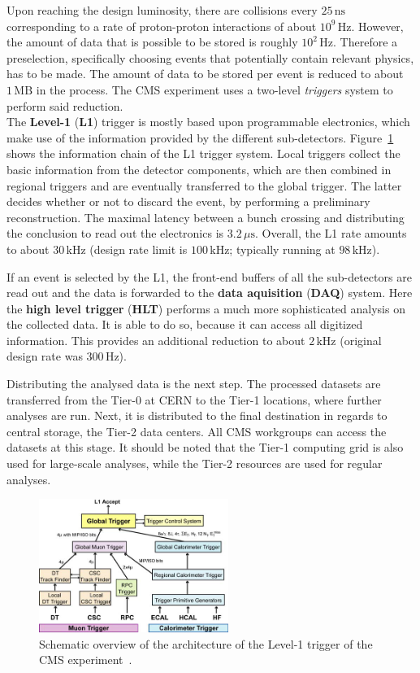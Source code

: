 Upon reaching the design luminosity, there are collisions every $25\,\text{ns}$ corresponding to a rate of proton-proton interactions of about $10^9\,\text{Hz}$. However, the amount of data that is possible to be stored is roughly $10^2\,\text{Hz}$. Therefore a preselection, specifically choosing events that potentially contain relevant physics, has to be made. The amount of data to be stored per event is reduced to about $1\,\text{MB}$ in the process. The CMS experiment uses a two-level \textit{triggers} system to perform said reduction. \\

The \textbf{Level-1} (\textbf{L1}) trigger is mostly based upon programmable electronics, which make use of the information provided by the different sub-detectors. Figure~\ref{fig:lvl1trig} shows the information chain of the L1 trigger system. Local triggers collect the basic information from the detector components, which are then combined in regional triggers and are eventually transferred to the global trigger. The latter decides whether or not to discard the event, by performing a preliminary reconstruction. The maximal latency between a bunch crossing and distributing the conclusion to read out the electronics is $3.2\,\mu\text{s}$. Overall, the L1 rate amounts to about $30\,\text{kHz}$ (design rate limit is $100\,\text{kHz}$; typically running at $98\,\text{kHz}$).

If an event is selected by the L1, the front-end buffers of all the sub-detectors are read out and the data is forwarded to the \textbf{data aquisition} (\textbf{DAQ}) system. Here the \textbf{high level trigger} (\textbf{HLT}) performs a much more sophisticated analysis on the collected data. It is able to do so, because it can access all digitized information. This provides an additional reduction to about $2\,\text{kHz}$ (original design rate was $300\,\text{Hz}$).

Distributing the analysed data is the next step. The processed datasets are transferred from the Tier-0 at CERN to the Tier-1 locations, where further analyses are run. Next, it is distributed to the final destination in regards to central storage, the Tier-2 data centers. All CMS workgroups can access the datasets at this stage. It should be noted that the Tier-1 computing grid is also used for large-scale analyses, while the Tier-2 resources are used for regular analyses.


\begin{figure}[ht!]
  \centering
  \includegraphics[width=0.55\textwidth]{plots/lvl1trigger.jpg}
  \caption{Schematic overview of the architecture of the Level-1 trigger of the CMS experiment~\cite{cmsjinst}.}
  \label{fig:lvl1trig}
\end{figure}


